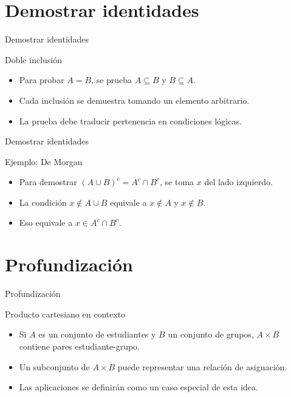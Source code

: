 \documentclass[aspectratio=169,11pt]{beamer}
\begin{document}
\section{Demostrar identidades}

\begin{frame}{Demostrar identidades}
\begin{block}{Doble inclusión}
\begin{itemize}
  \item Para probar \(A=B\), se prueba \(A\subseteq B\) y \(B\subseteq A\).
  \item Cada inclusión se demuestra tomando un elemento arbitrario.
  \item La prueba debe traducir pertenencia en condiciones lógicas.
\end{itemize}
\end{block}
\end{frame}

\begin{frame}{Demostrar identidades}
\begin{block}{Ejemplo: De Morgan}
\begin{itemize}
  \item Para demostrar \((A\cup B)^c=A^c\cap B^c\), se toma \(x\) del lado izquierdo.
  \item La condición \(x\notin A\cup B\) equivale a \(x\notin A\) y \(x\notin B\).
  \item Eso equivale a \(x\in A^c\cap B^c\).
\end{itemize}
\end{block}
\end{frame}

\section{Profundización}

\begin{frame}{Profundización}
\begin{block}{Producto cartesiano en contexto}
\begin{itemize}
  \item Si \(A\) es un conjunto de estudiantes y \(B\) un conjunto de grupos, \(A\times B\) contiene pares estudiante-grupo.
  \item Un subconjunto de \(A\times B\) puede representar una relación de asignación.
  \item Las aplicaciones se definirán como un caso especial de esta idea.
\end{itemize}
\end{block}
\end{frame}
\end{document}
